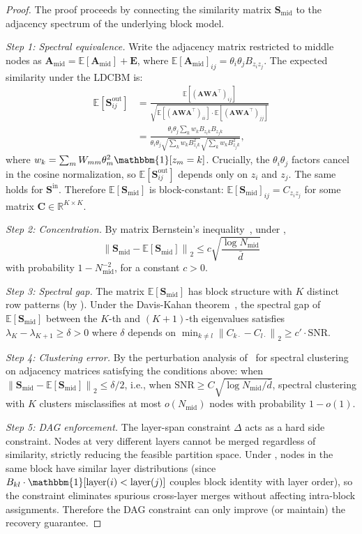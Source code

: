 \documentclass[11pt]{article}
\newcommand{\bA}{\mathbf{A}}
\newcommand{\bC}{\mathbf{C}}
\newcommand{\bS}{\mathbf{S}}
\newcommand{\bW}{\mathbf{W}}
\newcommand{\bEps}{\mathbf{E}}
\newcommand{\R}{\mathbb{R}}
\newcommand{\E}{\mathbb{E}}
\newcommand{\1}{\mathbbm{1}}
\newcommand{\norm}[1]{\left\lVert #1 \right\rVert}
\begin{document}
\begin{proof}
  The proof proceeds by connecting the similarity matrix $\bS_{\mathrm{mid}}$ to the adjacency spectrum of the underlying block model.

  \emph{Step 1: Spectral equivalence.}
  Write the adjacency matrix restricted to middle nodes as $\bA_{\mathrm{mid}} = \E[\bA_{\mathrm{mid}}] + \bEps$, where $\E[\bA_{\mathrm{mid}}]_{ij} = \theta_i \theta_j B_{z_i z_j}$.
  The expected similarity under the LDCBM is:
  \begin{align*}
    \E[\bS^{\mathrm{out}}_{ij}]
    &= \frac{\E[(\bA \bW \bA^\top)_{ij}]}{\sqrt{\E[(\bA \bW \bA^\top)_{ii}] \cdot \E[(\bA \bW \bA^\top)_{jj}]}} \\
    &= \frac{\theta_i \theta_j \sum_k w_k B_{z_i k} B_{z_j k}}{\theta_i \theta_j \sqrt{\sum_k w_k B_{z_i k}^2} \sqrt{\sum_k w_k B_{z_j k}^2}},
  \end{align*}
  where $w_k = \sum_m W_{mm} \theta_m^2 \1[z_m = k]$.
  Crucially, the $\theta_i \theta_j$ factors cancel in the cosine normalization, so $\E[\bS^{\mathrm{out}}_{ij}]$ depends only on $z_i$ and $z_j$.
  The same holds for $\bS^{\mathrm{in}}$.
  Therefore $\E[\bS_{\mathrm{mid}}]$ is block-constant: $\E[\bS_{\mathrm{mid}}]_{ij} = C_{z_i z_j}$ for some matrix $\bC \in \R^{K \times K}$.

  \emph{Step 2: Concentration.}
  By matrix Bernstein's inequality~\citep{tropp2012user}, under ,
  \[
    \norm{\bS_{\mathrm{mid}} - \E[\bS_{\mathrm{mid}}]}_2 \le c\sqrt{\frac{\log N_{\mathrm{mid}}}{\bar{d}}}
  \]
  with probability $1 - N_{\mathrm{mid}}^{-2}$, for a constant $c > 0$.

  \emph{Step 3: Spectral gap.}
  The matrix $\E[\bS_{\mathrm{mid}}]$ has block structure with $K$ distinct row patterns (by ).
  Under the Davis-Kahan theorem~\citep{davis1970rotation}, the spectral gap of $\E[\bS_{\mathrm{mid}}]$ between the $K$-th and $(K{+}1)$-th eigenvalues satisfies $\lambda_K - \lambda_{K+1} \ge \delta > 0$ where $\delta$ depends on $\min_{k \ne l} \norm{C_{k\cdot} - C_{l\cdot}}_2 \ge c' \cdot \mathrm{SNR}$.

  \emph{Step 4: Clustering error.}
  By the perturbation analysis of~\citet{lei2015consistency} for spectral clustering on adjacency matrices satisfying the conditions above:
  when $\norm{\bS_{\mathrm{mid}} - \E[\bS_{\mathrm{mid}}]}_2 \le \delta / 2$, i.e., when $\mathrm{SNR} \ge C\sqrt{\log N_{\mathrm{mid}} / \bar{d}}$, spectral clustering with $K$ clusters misclassifies at most $o(N_{\mathrm{mid}})$ nodes with probability $1 - o(1)$.

  \emph{Step 5: DAG enforcement.}
  The layer-span constraint $\Delta$ acts as a hard side constraint.
  Nodes at very different layers cannot be merged regardless of similarity, strictly reducing the feasible partition space.
  Under , nodes in the same block have similar layer distributions (since $B_{kl} \cdot \1[\mathrm{layer}(i) < \mathrm{layer}(j)]$ couples block identity with layer order), so the constraint eliminates spurious cross-layer merges without affecting intra-block assignments.
  Therefore the DAG constraint can only improve (or maintain) the recovery guarantee.
\end{proof}
\end{document}
